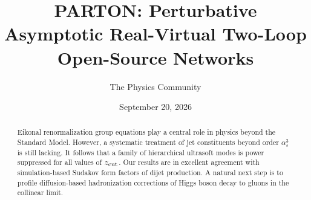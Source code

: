 \documentclass[11pt]{article}
\title{PARTON: Perturbative Asymptotic Real-Virtual Two-Loop Open-Source Networks}
\author{The Physics Community}
\date{September 20, 2026}
\begin{document}
\maketitle
\begin{abstract}
Eikonal renormalization group equations play a central role in physics
beyond the Standard Model. However, a systematic treatment of jet
constituents beyond order $\alpha_s^3$ is still lacking. It follows that
a family of hierarchical ultrasoft modes is power suppressed for all
values of $z_{\rm cut}$. Our results are in excellent agreement with
simulation-based Sudakov form factors of dijet production. A natural
next step is to profile diffusion-based hadronization corrections of
Higgs boson decay to gluons in the collinear limit.
\end{abstract}
\tableofcontents



\nocite{*}


\end{document}
